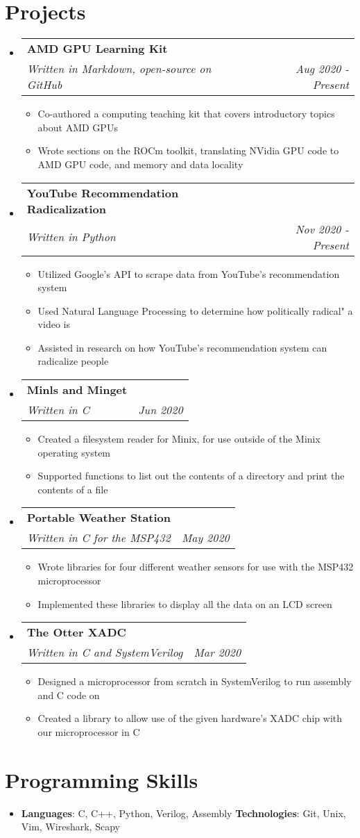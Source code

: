 \documentclass[letterpaper,11pt]{article}
\makeatletter
\newcommand{\resumeItemSingle}[1]{
	\item\small{
		{#1 \vspace{-2pt}}
	}
}
\newcommand{\resumeSubheading}[4]{
  \vspace{-1pt}\item
    \begin{tabular*}{0.97\textwidth}[t]{l@{\extracolsep{\fill}}r}
      \textbf{#1} & #2 \\
      \textit{\small#3} & \textit{\small #4} \\
    \end{tabular*}\vspace{-5pt}
}
\newcommand{\resumeSubHeadingListStart}{\begin{itemize}[leftmargin=*]}
\newcommand{\resumeSubHeadingListEnd}{\end{itemize}}
\newcommand{\resumeItemListStart}{\begin{itemize}}
\newcommand{\resumeItemListEnd}{\end{itemize}\vspace{-5pt}}
\makeatother
\begin{document}
\section{Projects}
  \resumeSubHeadingListStart

	\resumeSubheading
      {AMD GPU Learning Kit}{}
      {Written in Markdown, open-source on GitHub}{Aug 2020 - Present}
      \resumeItemListStart
        \resumeItemSingle {Co-authored a computing teaching kit that covers introductory topics about AMD GPUs}
        \resumeItemSingle {Wrote sections on the ROCm toolkit, translating NVidia GPU code to AMD GPU code, and memory and data locality}
      \resumeItemListEnd
      
	\resumeSubheading
      {YouTube Recommendation Radicalization}{}
      {Written in Python}{Nov 2020 - Present}
      \resumeItemListStart
        \resumeItemSingle {Utilized Google's API to scrape data from YouTube's recommendation system}
        \resumeItemSingle {Used Natural Language Processing to determine how politically radical" a video is}
        \resumeItemSingle {Assisted in research on how YouTube's recommendation system can radicalize people}
      \resumeItemListEnd

	\resumeSubheading
	  {Minls and Minget}{}
	  {Written in C}{Jun 2020}
	  \resumeItemListStart
	    \resumeItemSingle {Created a filesystem reader for Minix, for use outside of the Minix operating system}
	    \resumeItemSingle {Supported functions to list out the contents of a directory and print the contents of a file}
	  \resumeItemListEnd
	  
	\resumeSubheading
	  {Portable Weather Station}{}
	  {Written in C for the MSP432}{May 2020}
      \resumeItemListStart
        \resumeItemSingle {Wrote libraries for four different weather sensors for use with the MSP432 microprocessor}
        \resumeItemSingle {Implemented these libraries to display all the data on an LCD screen}
      \resumeItemListEnd
	  
	\resumeSubheading
      {The Otter XADC}{}
      {Written in C and SystemVerilog}{Mar 2020}
      \resumeItemListStart
        \resumeItemSingle {Designed a microprocessor from scratch in SystemVerilog to run assembly and C code on}
        \resumeItemSingle {Created a library to allow use of the given hardware’s XADC chip with our microprocessor in C}
      \resumeItemListEnd
	  
  \resumeSubHeadingListEnd

%
\section{Programming Skills}
  \resumeSubHeadingListStart
    \item{
      \textbf{Languages}{: C, C++, Python, Verilog, Assembly}
      \hfill
      \textbf{Technologies}{: Git, Unix, Vim, Wireshark, Scapy}
    }
  \resumeSubHeadingListEnd


\end{document}
